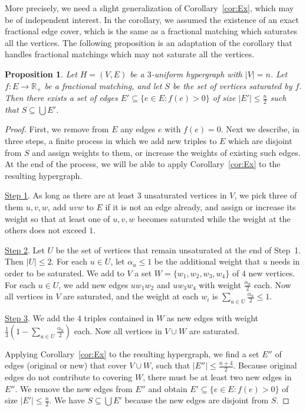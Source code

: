 \documentclass[10pt,a4paper]{amsart}
\newtheorem{proposition}[theorem]{Proposition}
\begin{document}
More precisely, we need a slight generalization of Corollary~\ref{cor:Ex}, which may be of independent interest. In the corollary, we assumed the existence of an exact fractional edge cover, which is the same as a fractional matching which saturates all the vertices. The following proposition is an adaptation of the corollary that handles fractional matchings which may not saturate all the vertices.
\begin{proposition} \label{pro:SAT}
Let $H = (V, E)$ be a $3$-uniform hypergraph with $|V| = n$. Let $f: E \to \mathbb{R}_+$ be a fractional matching, and let $S$ be the set of vertices saturated by $f$. Then there exists a set of edges $E' \subseteq \{ e \in E: f(e) > 0\}$ of size $|E'| \le \frac{n}{2}$ such that $S \subseteq \bigcup E'$.
\end{proposition}
\begin{proof} First, we remove from $E$ any edges $e$ with $f(e) = 0$. Next we describe, in three steps, a finite process in which we add new triples to $E$ which are disjoint from  $S$ and assign weights to them, or increase the weights of existing such edges. At the end of the process, we will be able to apply Corollary~\ref{cor:Ex} to the resulting hypergraph.

\vspace{5pt}

\noindent \underline{Step 1}. As long as there are at least $3$ unsaturated vertices in $V$, we pick three of them $u, v, w$, add $uvw$ to $E$ if it is not an edge already, and assign or increase its weight so that at least one of $u, v, w$ becomes saturated while the weight at the others does not exceed $1$.

\vspace{5pt}

\noindent \underline{Step 2}. Let $U$ be the set of vertices that remain unsaturated at the end of Step~1. Then $|U| \le 2$. For each $u \in U$, let $\alpha_u \le 1$ be the additional weight that $u$ needs in order to be saturated. We add to $V$ a set $W = \{w_1, w_2, w_3, w_4\}$ of $4$ new vertices. For each $u \in U$, we add new edges $uw_1w_2$ and $uw_3w_4$ with weight $\frac{\alpha_u}{2}$ each. Now all vertices in $V$ are saturated, and the weight at each $w_i$ is $\sum_{u \in U} \frac{\alpha_u}{2} \le 1$.

\vspace{5pt}

\noindent \underline{Step 3}. We add the $4$ triples contained in $W$ as new edges with weight $\frac{1}{3}(1 - \sum_{u \in U} \frac{\alpha_u}{2})$ each. Now all vertices in $V \cup W$ are saturated.

\vspace{5pt}

Applying Corollary~\ref{cor:Ex} to the resulting hypergraph, we find a set $E''$ of edges (original or new) that cover $V \cup W$, such that $|E''| \le \frac{n+4}{2}$. Because original edges do not contribute to covering $W$, there must be at least two new edges in $E''$. We remove the new edges from $E''$ and obtain $E' \subseteq \{e \in E: f(e) > 0\}$ of size $|E'| \le \frac{n}{2}$. We have $S \subseteq \bigcup E'$ because the new edges are disjoint from $S$.
\end{proof}
\end{document}
